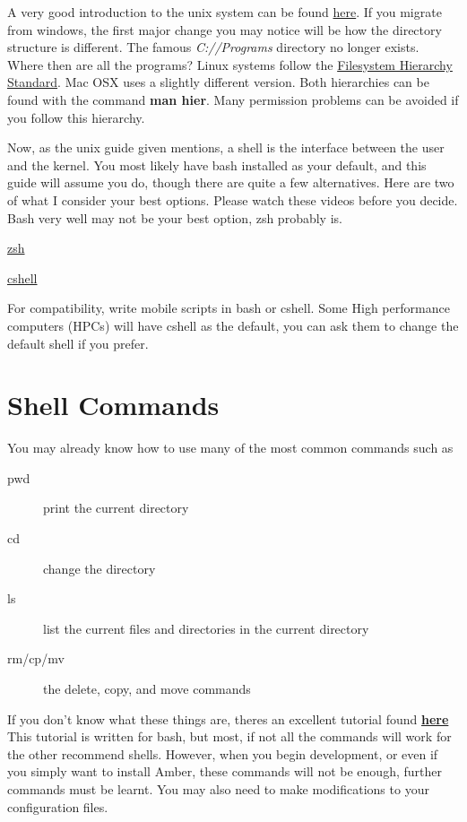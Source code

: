 \documentclass{article}
\begin{document}
A very good introduction to the unix system can be found \href{http://linuxcommand.org/lc3\_learning\_the\_shell.php}{here}.
If you migrate from windows, the first major change you may notice will be how the directory structure is different.
The famous \textit{C://Programs} directory no longer exists.
Where then are all the programs?
Linux systems follow the \href{https://en.wikipedia.org/wiki/Filesystem\_Hierarchy\_Standard}{Filesystem Hierarchy Standard}.
Mac OSX uses a slightly different version.
Both hierarchies can be found with the command \textbf{man hier}.
Many permission problems can be avoided if you follow this hierarchy.

Now, as the unix guide given mentions, a shell is the interface between the user and the kernel.
You most likely have bash installed as your default, and this guide will assume you do, though there are quite a few alternatives.
Here are two of what I consider your best options.
Please watch these videos before you decide.
Bash very well may not be your best option, zsh probably is.
\begin{description}
  \item \href{https://www.youtube.com/watch?v=1S3MUVIAieE}{zsh}
  \item \href{http://www.grymoire.com/Unix/Csh.html}{cshell}
\end{description}
For compatibility, write mobile scripts in bash or cshell.
Some High performance computers (HPCs) will have cshell as the default, you can ask them to change the default shell if you prefer.

\section*{Shell Commands}

You may already know how to use many of the most common commands such as
\begin{description}
  \item[pwd] print the current directory
  \item[cd] change the directory
  \item[ls] list the current files and directories in the current directory
  \item[rm/cp/mv] the delete, copy, and move commands
\end{description}
If you don't know what these things are, theres an excellent tutorial found \href{http://linuxcommand.org/lc3\_learning\_the\_shell.php}{\textbf{here}}
This tutorial is written for bash, but most, if not all the commands will work for the other recommend shells.
However, when you begin development, or even if you simply want to install Amber, these commands will not be enough, further commands must be learnt. 
You may also need to make modifications to your configuration files.
\end{document}
